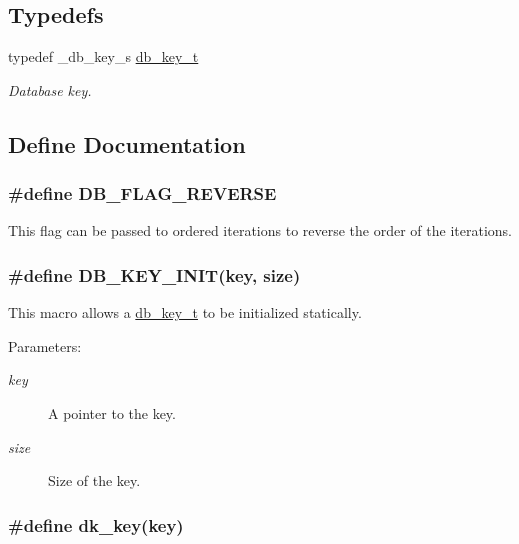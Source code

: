 \subsection*{Typedefs}
\begin{CompactItemize}
\item 
typedef \_\-db\_\-key\_\-s \hyperlink{group__dbprim_a0}{db\_\-key\_\-t}
\begin{CompactList}\small\item\em Database key. \item\end{CompactList}\end{CompactItemize}


\subsection{Define Documentation}
\hypertarget{group__dbprim_a4}{
\subsubsection[DB\_\-FLAG\_\-REVERSE]{\setlength{\rightskip}{0pt plus 5cm}\#define DB\_\-FLAG\_\-REVERSE}}
\label{group__dbprim_a4}


This flag can be passed to ordered iterations to reverse the order of the iterations. \hypertarget{group__dbprim_a1}{
\subsubsection[DB\_\-KEY\_\-INIT]{\setlength{\rightskip}{0pt plus 5cm}\#define DB\_\-KEY\_\-INIT(key, size)}}
\label{group__dbprim_a1}


This macro allows a \hyperlink{group__dbprim_a0}{db\_\-key\_\-t} to be initialized statically.

\begin{Desc}
\item[Parameters:]
\begin{description}
\item[{\em key}]A pointer to the key. \item[{\em size}]Size of the key. \end{description}
\end{Desc}
\hypertarget{group__dbprim_a2}{
\subsubsection[dk\_\-key]{\setlength{\rightskip}{0pt plus 5cm}\#define dk\_\-key(key)}}
\label{group__dbprim_a2}


